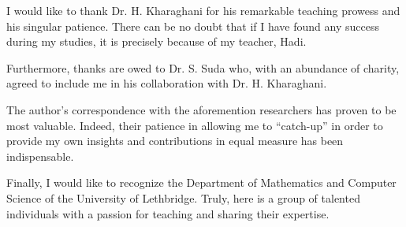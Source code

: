 \documentclass[../../main]{subfiles}
\begin{document}
 I would like to thank Dr. H. Kharaghani for his remarkable teaching prowess and his singular patience. There can be no doubt that if I have found any success during my studies, it is precisely because of my teacher, Hadi. 
 
 Furthermore, thanks are owed to Dr. S. Suda who, with an abundance of charity, agreed to include me in his collaboration with Dr. H. Kharaghani.

 The author's correspondence with the aforemention researchers has proven to be
 most valuable. Indeed, their patience in allowing me to ``catch-up'' in order
 to provide my own insights and contributions in equal measure has been indispensable.
 
 Finally, I would like to recognize the Department of Mathematics and Computer Science of the University of Lethbridge. Truly, here is a group of talented individuals with a passion for teaching and sharing their expertise.
\end{document}
